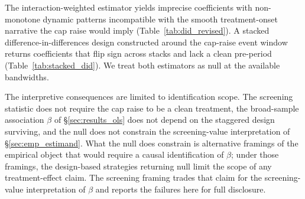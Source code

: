 The \citet{sun2021estimating} interaction-weighted estimator
yields imprecise coefficients with non-monotone dynamic patterns
incompatible with the smooth treatment-onset narrative the cap
raise would imply (Table~\ref{tab:did_revised}). A stacked
difference-in-differences design constructed around the
cap-raise event window returns coefficients that flip sign
across stacks and lack a clean pre-period
(Table~\ref{tab:stacked_did}). We treat both estimators as null
at the available bandwidths.

The interpretive consequences are limited to identification
scope. The screening statistic does not require the cap raise
to be a clean treatment, the broad-sample association $\beta$
of §\ref{sec:results_ols} does not depend on the staggered
design surviving, and the null does not constrain the
screening-value interpretation of §\ref{sec:emp_estimand}.
What the null does constrain is alternative framings of the
empirical object that would require a causal identification of
$\beta$; under those framings, the design-based strategies
returning null limit the scope of any treatment-effect claim.
The screening framing trades that claim for the screening-value
interpretation of $\beta$ and reports the failures here for full
disclosure.




